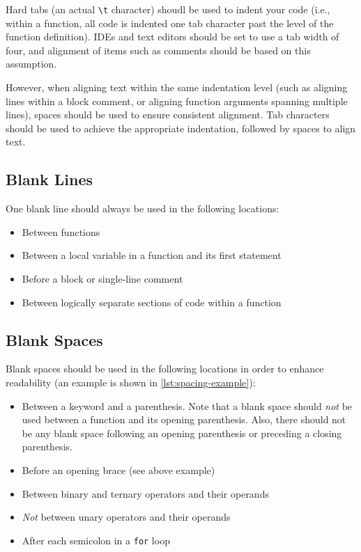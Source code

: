 \documentclass[StyleGuide.tex]{subfiles}
\begin{document}
Hard tabs (an actual \texttt{\textbackslash{}t} character) shoudl be used to
indent your code (i.e., within a function, all code is indented one tab
character past the level of the function definition). IDEs and text editors
should be set to use a tab width of four, and alignment of items such as
comments should be based on this assumption.

However, when aligning text within the same indentation level (such as aligning
lines within a block comment, or aligning function arguments spanning multiple
lines), spaces should be used to ensure consistent alignment. Tab characters
should be used to achieve the appropriate indentation, followed by spaces to
align text.
\subsection{Blank Lines}\label{blank-lines}

One blank line should always be used in the following locations:

\begin{itemize}
\item
  Between functions
\item
  Between a local variable in a function and its first statement
\item
  Before a block or single-line comment
\item
  Between logically separate sections of code within a function
\end{itemize}

\subsection{Blank Spaces}\label{blank-spaces}

Blank spaces should be used in the following locations in order to enhance
readability (an example is shown in \autoref{lst:spacing-example}):

\begin{itemize}
\item
  Between a keyword and a parenthesis. Note that a blank space should
  \emph{not} be used between a function and its opening parenthesis. Also,
  there should not be any blank space following an opening parenthesis
  or preceding a closing parenthesis.
\item
  Before an opening brace (see above example)
\item
  Between binary and ternary operators and their operands
\item
  \emph{Not} between unary operators and their operands
\item
  After each semicolon in a \texttt{for} loop
\end{itemize}
\end{document}
